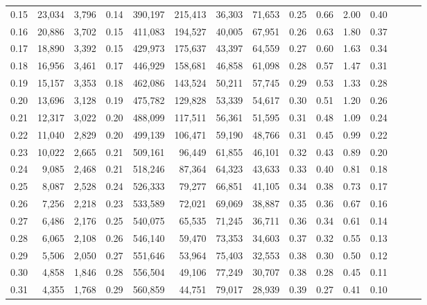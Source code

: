 \begin{tabular}{rrrrrrrrrrrrrrr}
0.15 &  23,034 &  3,796 &  0.14 &  390,197 &  215,413 &   36,303 &   71,653 &  0.25 &  0.66 &  2.00 &      0.40 \\
0.16 &  20,886 &  3,702 &  0.15 &  411,083 &  194,527 &   40,005 &   67,951 &  0.26 &  0.63 &  1.80 &      0.37 \\
0.17 &  18,890 &  3,392 &  0.15 &  429,973 &  175,637 &   43,397 &   64,559 &  0.27 &  0.60 &  1.63 &      0.34 \\
0.18 &  16,956 &  3,461 &  0.17 &  446,929 &  158,681 &   46,858 &   61,098 &  0.28 &  0.57 &  1.47 &      0.31 \\
0.19 &  15,157 &  3,353 &  0.18 &  462,086 &  143,524 &   50,211 &   57,745 &  0.29 &  0.53 &  1.33 &      0.28 \\
0.20 &  13,696 &  3,128 &  0.19 &  475,782 &  129,828 &   53,339 &   54,617 &  0.30 &  0.51 &  1.20 &      0.26 \\
0.21 &  12,317 &  3,022 &  0.20 &  488,099 &  117,511 &   56,361 &   51,595 &  0.31 &  0.48 &  1.09 &      0.24 \\
0.22 &  11,040 &  2,829 &  0.20 &  499,139 &  106,471 &   59,190 &   48,766 &  0.31 &  0.45 &  0.99 &      0.22 \\
0.23 &  10,022 &  2,665 &  0.21 &  509,161 &   96,449 &   61,855 &   46,101 &  0.32 &  0.43 &  0.89 &      0.20 \\
0.24 &   9,085 &  2,468 &  0.21 &  518,246 &   87,364 &   64,323 &   43,633 &  0.33 &  0.40 &  0.81 &      0.18 \\
0.25 &   8,087 &  2,528 &  0.24 &  526,333 &   79,277 &   66,851 &   41,105 &  0.34 &  0.38 &  0.73 &      0.17 \\
0.26 &   7,256 &  2,218 &  0.23 &  533,589 &   72,021 &   69,069 &   38,887 &  0.35 &  0.36 &  0.67 &      0.16 \\
0.27 &   6,486 &  2,176 &  0.25 &  540,075 &   65,535 &   71,245 &   36,711 &  0.36 &  0.34 &  0.61 &      0.14 \\
0.28 &   6,065 &  2,108 &  0.26 &  546,140 &   59,470 &   73,353 &   34,603 &  0.37 &  0.32 &  0.55 &      0.13 \\
0.29 &   5,506 &  2,050 &  0.27 &  551,646 &   53,964 &   75,403 &   32,553 &  0.38 &  0.30 &  0.50 &      0.12 \\
0.30 &   4,858 &  1,846 &  0.28 &  556,504 &   49,106 &   77,249 &   30,707 &  0.38 &  0.28 &  0.45 &      0.11 \\
0.31 &   4,355 &  1,768 &  0.29 &  560,859 &   44,751 &   79,017 &   28,939 &  0.39 &  0.27 &  0.41 &      0.10 \\

\end{tabular}
